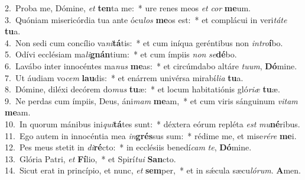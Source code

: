 {2.~}Proba me, Dómine, \textit{et} \textbf{ten}ta me:~* ure renes meos \textit{et} \textit{cor} \textbf{me}um.\\
{3.~}Quóniam misericórdia tua ante ócu\textit{los} \textbf{me}os est:~* et complácui in veri\textit{tá}\textit{te} \textbf{tu}a.\\
{4.~}Non sedi cum concílio va\textit{ni}\textbf{tá}tis:~* et cum iníqua geréntibus non \textit{in}\textit{tro}\textbf{í}bo.\\
{5.~}Odívi ecclésiam ma\textit{li}\textbf{gnán}tium:~* et cum ímpiis \textit{non} \textit{se}\textbf{dé}bo.\\
{6.~}Lavábo inter innocéntes ma\textit{nus} \textbf{me}as:~* et circúmdabo altáre \textit{tu}\textit{um}, \textbf{Dó}mine.\\
{7.~}Ut áudiam vo\textit{cem} \textbf{lau}dis:~* et enárrem univérsa mirabí\textit{li}\textit{a} \textbf{tu}a.\\
{8.~}Dómine, diléxi decórem do\textit{mus} \textbf{tu}æ:~* et locum habitatiónis gló\textit{ri}\textit{æ} \textbf{tu}æ.\\
{9.~}Ne perdas cum ímpiis, Deus, áni\textit{mam} \textbf{me}am,~* et cum viris sánguinum \textit{vi}\textit{tam} \textbf{me}am.\\
{10.~}In quorum mánibus ini\textit{qui}\textbf{tá}tes sunt:~* déxtera eórum repléta \textit{est} \textit{mu}\textbf{né}ribus.\\
{11.~}Ego autem in innocéntia mea \textit{in}\textbf{grés}sus sum:~* rédime me, et mise\textit{ré}\textit{re} \textbf{me}i.\\
{12.~}Pes meus stetit in \textit{di}\textbf{ré}cto:~* in ecclésiis benedí\textit{cam} \textit{te}, \textbf{Dó}mine.\\
{13.~}Glória Patri, \textit{et} \textbf{Fí}lio,~* et Spirí\textit{tu}\textit{i} \textbf{San}cto.\\
{14.~}Sicut erat in princípio, et nunc, \textit{et} \textbf{sem}per,~* et in sǽcula sæcu\textit{ló}\textit{rum}. \textbf{A}men.\\
